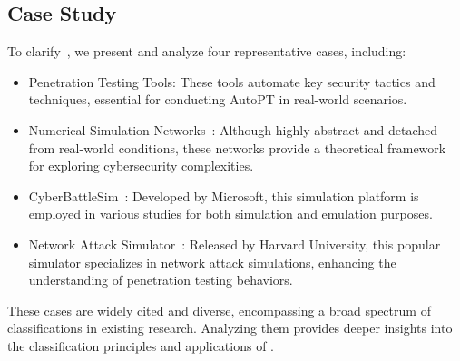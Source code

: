 
\subsection{Case Study}

To clarify~\modelcla, we present and analyze four representative cases, including:

\begin{itemize}
    \item Penetration Testing Tools: These tools automate key security tactics and techniques, essential for conducting AutoPT in real-world scenarios.
    \item Numerical Simulation Networks~\cite{2020Finding}: Although highly abstract and detached from real-world conditions, these networks provide a theoretical framework for exploring cybersecurity complexities.
    \item CyberBattleSim~\cite{Cyberbattlesim}: Developed by Microsoft, this simulation platform is employed in various studies for both simulation and emulation purposes.
    \item Network Attack Simulator~\cite{schwartz2019autonomous}: Released by Harvard University, this popular simulator specializes in network attack simulations, enhancing the understanding of penetration testing behaviors.
\end{itemize}


These cases are widely cited and diverse, encompassing a broad spectrum of classifications in existing research. Analyzing them provides deeper insights into the classification principles and applications of \modelcla.

